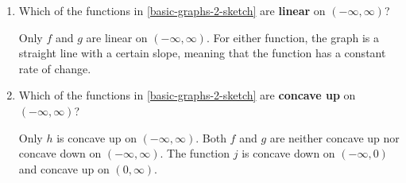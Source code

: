 \documentclass{article}
\begin{document}
\begin{enumerate}
\begin{enumerate}
  \item
    \begin{problem}[\vfill]
      Which of the functions in \ref{basic-graphs-2-sketch} are \textbf{linear} on $(-\infty, \infty)$?
    \end{problem}

    \begin{solution}
      Only $f$ and $g$ are linear on $(-\infty, \infty)$. For either function, the graph is a straight 
      line with a certain slope, meaning that the function has a constant rate of change.
    \end{solution}

  \item 
    \begin{problem}[\vfill]
      Which of the functions in \ref{basic-graphs-2-sketch} are \textbf{concave up} on $(-\infty, \infty)$?
    \end{problem}

    \begin{solution}
      Only $h$ is concave up on $(-\infty, \infty)$. Both $f$ and $g$ are neither concave up nor concave down on $(-\infty, \infty)$. The function $j$ is concave down
      on $(-\infty,0)$ and concave up on $(0,\infty)$.
    \end{solution}
  \end{enumerate}


\end{enumerate}
\end{document}
